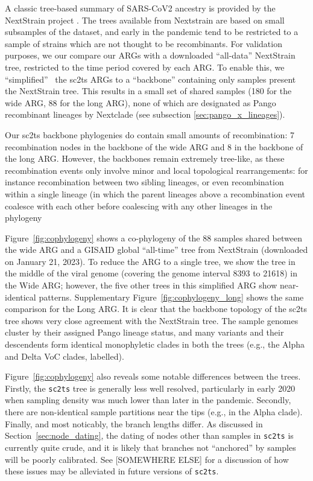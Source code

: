 \documentclass{article}
\begin{document}
A classic tree-based summary of SARS-CoV2 ancestry is provided
by the NextStrain project \citep{Hadfield2018-ef}. The trees
available from Nextstrain are based on small subsamples of the
dataset, and early in the pandemic tend to be restricted to
a sample of strains which are not thought to be recombinants.
For validation purposes, we our compare our ARGs with
a downloaded ``all-data'' NextStrain tree, restricted to the time period
covered by each ARG. To enable this, we ``simplified''~\citep{Kelleher2018-xc}
the sc2ts ARGs to a ``backbone'' containing only samples present
the NextStrain tree. This results in a small set of shared
samples (180 for the wide ARG, 88 for the long ARG), none of which are
designated as Pango recombinant lineages by Nextclade (see subsection
\ref{sec:pango_x_lineages}).

Our sc2ts backbone phylogenies do contain small amounts of recombination:
7 recombination nodes in the backbone of the wide ARG and 8 in the backbone
of the long ARG. However, the backbones remain extremely tree-like, as these
recombination events only involve minor and local topological rearrangements:
for instance recombination between two sibling lineages, or even recombination
within a single lineage (in which the parent lineages above a recombination event
coalesce with each other before coalescing with any other lineages in
the phylogeny



Figure~\ref{fig:cophylogeny} shows a co-phylogeny of the 88 samples shared
between the wide ARG and a GISAID global ``all-time'' tree from NextStrain
(downloaded on January 21, 2023).
To reduce the ARG to a single tree, we show
the tree in the middle of the viral genome (covering the genome interval 8393 to 21618)
in the Wide ARG;
however, the five other trees in this
simplified ARG show near-identical patterns. Supplementary
Figure~\ref{fig:cophylogeny_long} shows the same comparison for the Long ARG.
It is clear that the backbone topology of the sc2ts tree shows very close
agreement with the NextStrain tree. The sample genomes cluster by their
assigned Pango lineage status, and many variants and their descendents form
identical monophyletic clades in both the trees (e.g., the Alpha and Delta VoC
clades, labelled).

Figure~\ref{fig:cophylogeny} also reveals some notable differences between the
trees. Firstly, the \texttt{sc2ts} tree is generally less well resolved,
particularly in early 2020 when sampling density was much lower than
later in the pandemic.
Secondly, there are non-identical sample partitions
near the tips (e.g., in the Alpha clade).
Finally, and most noticably, the branch lengths differ.
As discussed in Section~\ref{sec:node_dating}, the dating of nodes
other than samples in \texttt{sc2ts} is currently quite crude, and
it is likely that branches not ``anchored'' by samples will be
poorly calibrated. See [SOMEWHERE ELSE] for a discussion of how
these issues may be alleviated in future versions of \texttt{sc2ts}.
\end{document}
